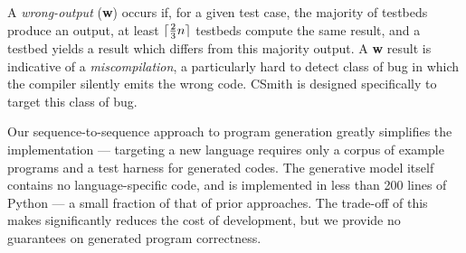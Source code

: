 A \emph{wrong-output} (\textbf{w}) occurs if, for a given test case, the majority of testbeds produce an output, at least $\lceil\frac{2}{3}n\rceil$ testbeds compute the same result, and a testbed yields a result which differs from this majority output. A \textbf{w} result is indicative of a \emph{miscompilation}, a particularly hard to detect class of bug in which the compiler silently emits the wrong code. CSmith is designed specifically to target this class of bug.



%




Our sequence-to-sequence approach to program generation greatly simplifies the implementation --- targeting a new language requires only a corpus of example programs and a test harness for generated codes. The generative model itself contains no language-specific code, and is implemented in less than 200 lines of Python --- a small fraction of that of prior approaches. The trade-off of this makes significantly reduces the cost of development, but we provide no guarantees on generated program correctness. 

